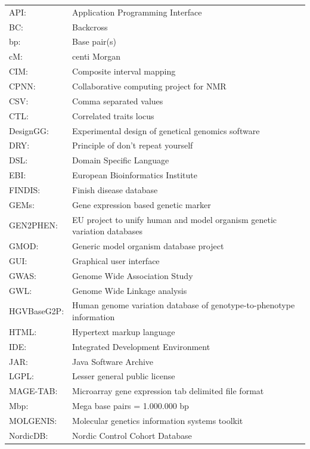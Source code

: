 {\footnotesize
\begin{tabular}{ l l }
API:         & Application Programming Interface\\
BC:          & Backcross \\
bp:          & Base pair(s) \\
cM:          & centi Morgan \\
CIM:         & Composite interval mapping \\
CPNN:        & Collaborative computing project for NMR\\
CSV:         & Comma separated values\\
CTL:         & Correlated traits locus \\
DesignGG:    & Experimental design of genetical genomics software\\
DRY:         & Principle of don't repeat yourself\\
DSL:         & Domain Specific Language\\
EBI:         & European Bioinformatics Institute\\
FINDIS:      & Finish disease database\\
GEMs:        & Gene expression based genetic marker\\
GEN2PHEN:    & EU project to unify human and model organism genetic variation databases\\
GMOD:        & Generic model organism database project\\
GUI:         & Graphical user interface\\
GWAS:        & Genome Wide Association Study\\
GWL:         & Genome Wide Linkage analysis\\
HGVBaseG2P:  & Human genome variation database of genotype-to-phenotype information\\
HTML:        & Hypertext markup language\\
IDE:         & Integrated Development Environment\\
JAR:         & Java Software Archive\\
LGPL:        & Lesser general public license\\
MAGE-TAB:    & Microarray gene expression tab delimited file format\\
Mbp:         & Mega base pairs = 1.000.000 bp \\
MOLGENIS:    & Molecular genetics information systems toolkit\\
NordicDB:    & Nordic Control Cohort Database\\

\end{tabular}}

